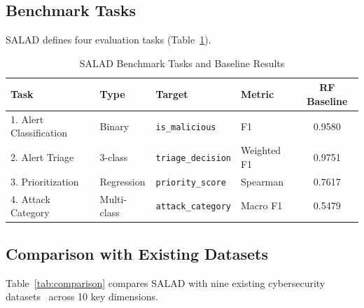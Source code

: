 \documentclass[review]{elsarticle}
\begin{document}
\subsection{Benchmark Tasks}

SALAD defines four evaluation tasks (Table~\ref{tab:tasks}).

\begin{table}[h]
\centering
\caption{SALAD Benchmark Tasks and Baseline Results}
\label{tab:tasks}
\begin{tabular}{llllc}
\toprule
\textbf{Task} & \textbf{Type} & \textbf{Target} & \textbf{Metric} & \textbf{RF Baseline} \\
\midrule
1. Alert Classification & Binary & \texttt{is\_malicious} & F1 & 0.9580 \\
2. Alert Triage & 3-class & \texttt{triage\_decision} & Weighted F1 & 0.9751 \\
3. Prioritization & Regression & \texttt{priority\_score} & Spearman & 0.7617 \\
4. Attack Category & Multi-class & \texttt{attack\_category} & Macro F1 & 0.5479 \\
\bottomrule
\end{tabular}
\end{table}


\subsection{Comparison with Existing Datasets}

Table~\ref{tab:comparison} compares SALAD with nine existing cybersecurity datasets~\cite{tavallaee2009kdd,sharafaldin2018,moustafa2015,msguide2024,landauer2024,husak2019,casilimas2024uwf,rodriguez2020mordor,sabu2023,cage2022cyborg} across 10 key dimensions.
\end{document}
